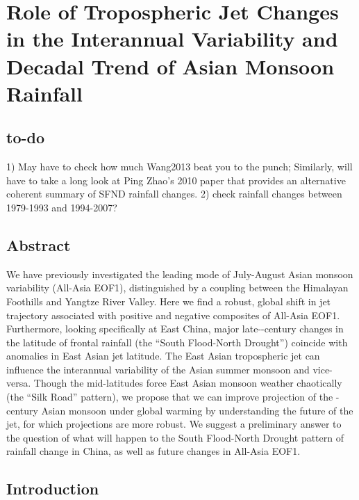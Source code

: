 \chapter{Role of Tropospheric Jet Changes in the Interannual Variability and Decadal Trend of Asian Monsoon Rainfall}

\section{to-do}
1) May have to check how much Wang2013 beat you to the punch; Similarly, will have to take a long look at Ping Zhao's 2010 paper that provides an alternative coherent summary of SFND rainfall changes. 2) check rainfall changes between 1979-1993 and 1994-2007?

\section{Abstract}
We have previously investigated the leading mode of July-August Asian monsoon variability (All-Asia EOF1), distinguished by a coupling between the Himalayan Foothills and Yangtze River Valley. Here we find a robust, global shift in jet trajectory associated with positive and negative composites of All-Asia EOF1. Furthermore, looking specifically at East China, major late--century changes in the latitude of frontal rainfall (the ``South Flood-North Drought'') coincide with anomalies in East Asian jet latitude. The East Asian tropospheric jet can influence the interannual variability of the Asian summer monsoon and vice-versa. Though the mid-latitudes force East Asian monsoon weather chaotically (the ``Silk Road'' pattern), we propose that we can improve projection of the -century Asian monsoon under global warming by understanding the future of the jet, for which projections are more robust. We suggest a preliminary answer to the question of what will happen to the South Flood-North Drought pattern of rainfall change in China, as well as future changes in All-Asia EOF1.

\section{Introduction}


